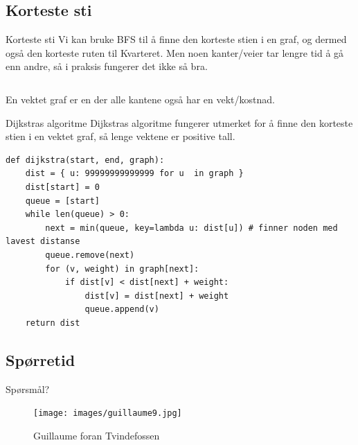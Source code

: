 \subsection{Korteste sti}
\begin{frame}[fragile]{Korteste sti}
    Vi kan bruke BFS til å finne den korteste stien i en graf, og dermed også den korteste ruten til Kvarteret. Men noen kanter/veier tar lengre tid å gå enn andre, så i praksis fungerer det ikke så bra.
    \begin{columns}
        \begin{column}{0.48\textwidth}
        \end{column}
        \begin{column}{0.48\textwidth}
        \end{column}
    \end{columns}
    \begin{definition}
        En vektet graf er en der alle kantene også har en vekt/kostnad.
    \end{definition}
\end{frame}

\begin{frame}[fragile]{Dijkstras algoritme}
    Dijkstras algoritme fungerer utmerket for å finne den korteste stien i en vektet graf, så lenge vektene er positive tall.
    \begin{verbatim}
def dijkstra(start, end, graph):
    dist = { u: 99999999999999 for u  in graph }
    dist[start] = 0
    queue = [start]
    while len(queue) > 0:
        next = min(queue, key=lambda u: dist[u]) # finner noden med lavest distanse
        queue.remove(next)
        for (v, weight) in graph[next]:
            if dist[v] < dist[next] + weight:
                dist[v] = dist[next] + weight
                queue.append(v)
    return dist
    \end{verbatim}
\end{frame}

\subsection*{Spørretid}
\begin{frame}{Spørsmål?}
    \begin{figure}
        \centering
        \texttt{[image: images/guillaume9.jpg]}
        \caption{Guillaume foran Tvindefossen}
        \label{fig:guillaume9}
    \end{figure}
\end{frame}
